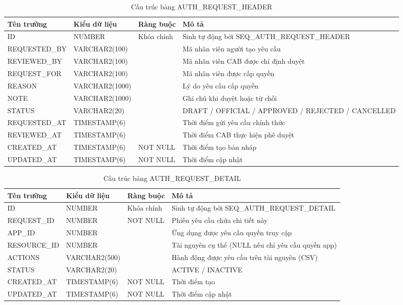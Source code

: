 \documentclass[../DoAn.tex]{subfiles}
\begin{document}
\begin{table}[H]
\centering
\caption{Cấu trúc bảng AUTH\_REQUEST\_HEADER}
\label{tab:auth-request-header}
\footnotesize
\begin{tabular}{|p{3.0cm}|p{2.3cm}|p{2.7cm}|p{4.5cm}|}
\hline
\textbf{Tên trường} & \textbf{Kiểu dữ liệu} & \textbf{Ràng buộc} & \textbf{Mô tả} \\ \hline
ID & NUMBER & Khóa chính & Sinh tự động bởi SEQ\_AUTH\_REQUEST\_HEADER \\ \hline
REQUESTED\_BY & VARCHAR2(100) & & Mã nhân viên người tạo yêu cầu \\ \hline
REVIEWED\_BY & VARCHAR2(100) & & Mã nhân viên CAB được chỉ định duyệt \\ \hline
REQUEST\_FOR & VARCHAR2(100) & & Mã nhân viên được cấp quyền \\ \hline
REASON & VARCHAR2(1000) & & Lý do yêu cầu cấp quyền \\ \hline
NOTE & VARCHAR2(1000) & & Ghi chú khi duyệt hoặc từ chối \\ \hline
STATUS & VARCHAR2(20) & & DRAFT / OFFICIAL / APPROVED / REJECTED / CANCELLED \\ \hline
REQUESTED\_AT & TIMESTAMP(6) & & Thời điểm gửi yêu cầu chính thức \\ \hline
REVIEWED\_AT & TIMESTAMP(6) & & Thời điểm CAB thực hiện phê duyệt \\ \hline
CREATED\_AT & TIMESTAMP(6) & NOT NULL & Thời điểm tạo bản nháp \\ \hline
UPDATED\_AT & TIMESTAMP(6) & NOT NULL & Thời điểm cập nhật \\ \hline
\end{tabular}
\end{table}

\begin{table}[H]
\centering
\caption{Cấu trúc bảng AUTH\_REQUEST\_DETAIL}
\label{tab:auth-request-detail}
\footnotesize
\begin{tabular}{|p{3.0cm}|p{2.3cm}|p{2.7cm}|p{4.5cm}|}
\hline
\textbf{Tên trường} & \textbf{Kiểu dữ liệu} & \textbf{Ràng buộc} & \textbf{Mô tả} \\ \hline
ID & NUMBER & Khóa chính & Sinh tự động bởi SEQ\_AUTH\_REQUEST\_DETAIL \\ \hline
REQUEST\_ID & NUMBER & NOT NULL & Phiếu yêu cầu chứa chi tiết này \\ \hline
APP\_ID & NUMBER & & Ứng dụng được yêu cầu quyền truy cập \\ \hline
RESOURCE\_ID & NUMBER & & Tài nguyên cụ thể (NULL nếu chỉ yêu cầu quyền app) \\ \hline
ACTIONS & VARCHAR2(500) & & Hành động được yêu cầu trên tài nguyên (CSV) \\ \hline
STATUS & VARCHAR2(20) & & ACTIVE / INACTIVE \\ \hline
CREATED\_AT & TIMESTAMP(6) & NOT NULL & Thời điểm tạo \\ \hline
UPDATED\_AT & TIMESTAMP(6) & NOT NULL & Thời điểm cập nhật \\ \hline
\end{tabular}
\end{table}
\end{document}
